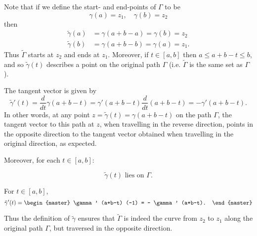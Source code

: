 Note that if we define the start- and end-points of $\Gamma$ to be
 \[ \gamma (a) = z_1, \quad \gamma (b) = z_2 \] 
 then
\begin{align*}
\tilde{\gamma} (a) & = \gamma (a+b-a) = \gamma (b) = z_2 \\
\tilde{\gamma} (b) & = \gamma (a+b-b) = \gamma (a) = z_1.
\end{align*} 
Thus $\tilde{\Gamma}$ starts at $z_2$ and ends at $z_1$.  Moreover, if $t \in [a,b]$ then $a \leq a+b-t \leq b$, and so $\tilde{\gamma} (t)$ describes a point on the original path $\Gamma$ (i.e. $\tilde{\Gamma}$ is the same set as $\Gamma$).

The tangent vector is given by
\[
\tilde{\gamma} ' (t) = \frac{d}{dt} \gamma (a+b-t) = \gamma'(a+b-t) \frac{d}{dt}(a+b-t) = - \gamma'(a+b-t).
\]
In other words, at any point $z = \tilde{\gamma} (t) = \gamma (a+b-t)$ on the path $\Gamma$, the tangent vector to this path at $z$, when travelling in the reverse direction, points in the opposite direction to the tangent vector obtained when travelling in the original direction, as expected.
 \begin{note}
 Moreover, for each $t \in [a,b]$:
 

  \[ \tilde{\gamma} (t) \text{ lies on } \Gamma .\]  

For $t \in [a,b]$, 
\[
\tilde{\gamma} ' (t) = \begin{master} \gamma' (a+b-t) (-1) = - \gamma' (a+b-t). \end{master}
\]
\end{note}

Thus the definition of $\tilde{\gamma}$ ensures that $\tilde{\Gamma}$ is indeed the curve from $z_2$ to $z_1$ along the original path $\Gamma$, but traversed in the opposite direction.

